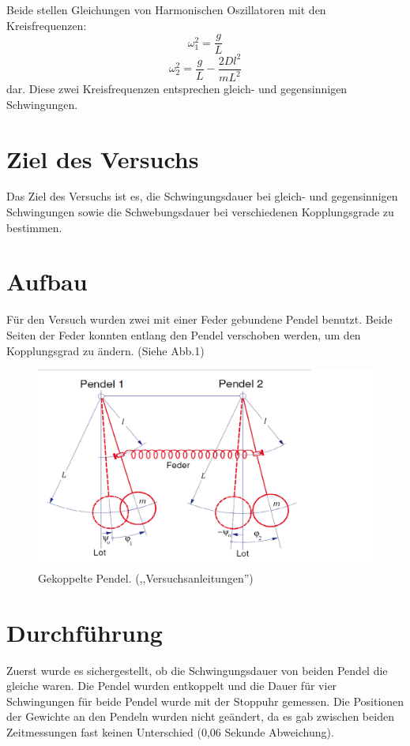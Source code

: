 \documentclass[11pt,a4paper]{article}
\begin{document}
Beide stellen Gleichungen von Harmonischen Oszillatoren mit den Kreisfrequenzen:
$$ \omega_1^2 = \frac{g}{L}$$
$$ \omega_2^2 = \frac{g}{L}-\frac{2Dl^2}{mL^2} $$
dar.
Diese zwei Kreisfrequenzen entsprechen gleich- und gegensinnigen Schwingungen. 

\section{Ziel des Versuchs}
Das Ziel des Versuchs ist es, die Schwingungsdauer bei gleich- und gegensinnigen Schwingungen sowie die Schwebungsdauer bei verschiedenen Kopplungsgrade zu bestimmen. 
\section{Aufbau}
Für den Versuch wurden zwei mit einer Feder gebundene Pendel benutzt. Beide Seiten der Feder konnten entlang den Pendel verschoben werden, um den Kopplungsgrad zu ändern. 
(Siehe Abb.1)
\begin{figure}
	\centering
	\includegraphics[scale=0.5]{ver19}
	\caption { Gekoppelte Pendel. (,,Versuchsanleitungen'') }
\end{figure}

\section{Durchführung}
Zuerst wurde es sichergestellt, ob die Schwingungsdauer von beiden Pendel die gleiche waren. Die Pendel wurden entkoppelt und die Dauer für vier Schwingungen für beide Pendel wurde mit der Stoppuhr gemessen. Die Positionen der Gewichte an den Pendeln wurden nicht geändert, da es gab zwischen beiden Zeitmessungen fast keinen Unterschied (0,06 Sekunde Abweichung).
\end{document}
